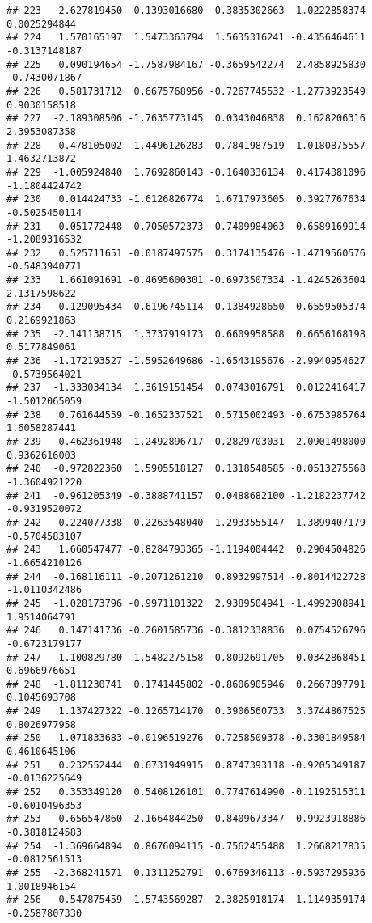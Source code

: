 \documentclass[
]{article}
\begin{document}
\begin{verbatim}
## 223   2.627819450 -0.1393016680 -0.3835302663 -1.0222858374  0.0025294844
## 224   1.570165197  1.5473363794  1.5635316241 -0.4356464611 -0.3137148187
## 225   0.090194654 -1.7587984167 -0.3659542274  2.4858925830 -0.7430071867
## 226   0.581731712  0.6675768956 -0.7267745532 -1.2773923549  0.9030158518
## 227  -2.189308506 -1.7635773145  0.0343046838  0.1628206316  2.3953087358
## 228   0.478105002  1.4496126283  0.7841987519  1.0180875557  1.4632713872
## 229  -1.005924840  1.7692860143 -0.1640336134  0.4174381096 -1.1804424742
## 230   0.014424733 -1.6126826774  1.6717973605  0.3927767634 -0.5025450114
## 231  -0.051772448 -0.7050572373 -0.7409984063  0.6589169914 -1.2089316532
## 232   0.525711651 -0.0187497575  0.3174135476 -1.4719560576 -0.5483940771
## 233   1.661091691 -0.4695600301 -0.6973507334 -1.4245263604  2.1317598622
## 234   0.129095434 -0.6196745114  0.1384928650 -0.6559505374  0.2169921863
## 235  -2.141138715  1.3737919173  0.6609958588  0.6656168198  0.5177849061
## 236  -1.172193527 -1.5952649686 -1.6543195676 -2.9940954627 -0.5739564021
## 237  -1.333034134  1.3619151454  0.0743016791  0.0122416417 -1.5012065059
## 238   0.761644559 -0.1652337521  0.5715002493 -0.6753985764  1.6058287441
## 239  -0.462361948  1.2492896717  0.2829703031  2.0901498000  0.9362616003
## 240  -0.972822360  1.5905518127  0.1318548585 -0.0513275568 -1.3604921220
## 241  -0.961205349 -0.3888741157  0.0488682100 -1.2182237742 -0.9319520072
## 242   0.224077338 -0.2263548040 -1.2933555147  1.3899407179 -0.5704583107
## 243   1.660547477 -0.8284793365 -1.1194004442  0.2904504826 -1.6654210126
## 244  -0.168116111 -0.2071261210  0.8932997514 -0.8014422728 -1.0110342486
## 245  -1.028173796 -0.9971101322  2.9389504941 -1.4992908941  1.9514064791
## 246   0.147141736 -0.2601585736 -0.3812338836  0.0754526796 -0.6723179177
## 247   1.100829780  1.5482275158 -0.8092691705  0.0342868451  0.6966976651
## 248  -1.811230741  0.1741445802 -0.8606905946  0.2667897791  0.1045693708
## 249   1.137427322 -0.1265714170  0.3906560733  3.3744867525  0.8026977958
## 250   1.071833683 -0.0196519276  0.7258509378 -0.3301849584  0.4610645106
## 251   0.232552444  0.6731949915  0.8747393118 -0.9205349187 -0.0136225649
## 252   0.353349120  0.5408126101  0.7747614990 -0.1192515311 -0.6010496353
## 253  -0.656547860 -2.1664844250  0.8409673347  0.9923918886 -0.3818124583
## 254  -1.369664894  0.8676094115 -0.7562455488  1.2668217835 -0.0812561513
## 255  -2.368241571  0.1311252791  0.6769346113 -0.5937295936  1.0018946154
## 256   0.547875459  1.5743569287  2.3825918174 -1.1149359174 -0.2587807330

\end{verbatim}
\end{document}
